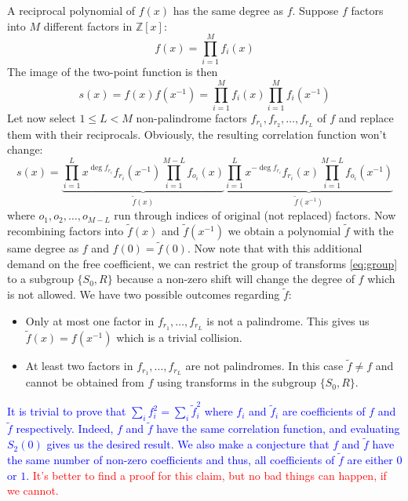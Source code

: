 \documentclass[12pt, a4paper]{article}
\begin{document}
A reciprocal polynomial of $f(x)$ has the same degree as $f$. Suppose $f$
factors into $M$ different factors in $\mathbb{Z}[x]$:
\begin{equation*}
  f(x) = \prod_{i=1}^M f_i(x)
\end{equation*}
The image of the two-point function is then
\begin{equation*}
  s(x) = f(x)f(x^{-1}) = \prod_{i=1}^M f_i(x) \prod_{i=1}^M f_i(x^{-1})
\end{equation*}
Let now select $1 \le L < M$ non-palindrome factors
$f_{r_1}, f_{r_2}, \dots, f_{r_L}$ of $f$ and replace them with their
reciprocals. Obviously, the resulting correlation function won't change:
\begin{equation*}
  s(x) = \underbrace{\prod_{i=1}^L x^{\deg f_{r_i}} f_{r_i}(x^{-1}) \prod_{i=1}^{M-L} f_{o_i}(x)}_{\tilde{f}(x)}
  \underbrace{\prod_{i=1}^L x^{-\deg f_{r_i}} f_{r_i}(x) \prod_{i=1}^{M-L} f_{o_i}(x^{-1})}_{\tilde{f}(x^{-1})}
\end{equation*}
where $o_1, o_2, \dots, o_{M-L}$ run through indices of original (not replaced)
factors. Now recombining factors into $\tilde{f}(x)$ and $\tilde{f}(x^{-1})$ we
obtain a polynomial $\tilde{f}$ with the same degree as $f$ and $f(0) = \tilde{f}(0)$.
Now note that with this additional demand on the free coefficient, we can
restrict the group of transforms \cref{eq:group} to a subgroup $\{S_0, R\}$
because a non-zero shift will change the degree of $f$ which is not allowed. We
have two possible outcomes regarding $\tilde{f}$:
\begin{itemize}
\item Only at most one factor in $f_{r_1}, \dots, f_{r_L}$ is not a
  palindrome. This gives us $\tilde{f}(x) = f(x^{-1})$ which is a trivial
  collision.
\item At least two factors in $f_{r_1}, \dots, f_{r_L}$ are not palindromes. In
  this case $\tilde{f} \ne f$ and cannot be obtained from $f$ using transforms
  in the subgroup $\{S_0, R\}$.
\end{itemize}

\textcolor{blue}{It is trivial to prove that $\sum_if_i^2 = \sum_i\tilde{f}_i^2$
  where $f_i$ and $\tilde{f}_i$ are coefficients of $f$ and $\tilde{f}$
  respectively. Indeed, $f$ and $\tilde{f}$ have the same correlation function,
  and evaluating $S_2(0)$ gives us the desired result. We also make a conjecture
  that $f$ and $\tilde{f}$ have the same number of non-zero coefficients and
  thus, all coefficients of $\tilde{f}$ are either $0$ or $1$.}
\textcolor{red}{It's better to find a proof for this claim, but no bad things
  can happen, if we cannot.}
\end{document}
